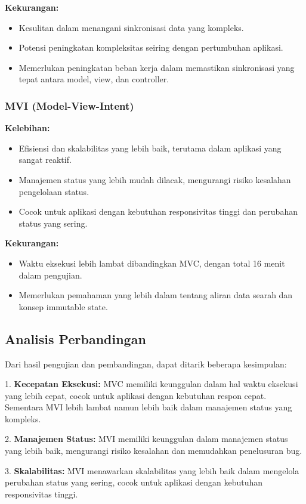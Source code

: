\documentclass[conference]{IEEEtran}
\begin{document}
\textbf{Kekurangan:}
\begin{itemize}
    \item Kesulitan dalam menangani sinkronisasi data yang kompleks.
    \item Potensi peningkatan kompleksitas seiring dengan pertumbuhan aplikasi.
    \item Memerlukan peningkatan beban kerja dalam memastikan sinkronisasi yang tepat antara model, view, dan controller.
\end{itemize}

\subsubsection{MVI (Model-View-Intent)}
\textbf{Kelebihan:}
\begin{itemize}
    \item Efisiensi dan skalabilitas yang lebih baik, terutama dalam aplikasi yang sangat reaktif.
    \item Manajemen status yang lebih mudah dilacak, mengurangi risiko kesalahan pengelolaan status.
    \item Cocok untuk aplikasi dengan kebutuhan responsivitas tinggi dan perubahan status yang sering.
\end{itemize}

\textbf{Kekurangan:}
\begin{itemize}
    \item Waktu eksekusi lebih lambat dibandingkan MVC, dengan total 16 menit dalam pengujian.
    \item Memerlukan pemahaman yang lebih dalam tentang aliran data searah dan konsep immutable state.
\end{itemize}

\subsection{Analisis Perbandingan}
Dari hasil pengujian dan pembandingan, dapat ditarik beberapa kesimpulan:

1. \textbf{Kecepatan Eksekusi:} MVC memiliki keunggulan dalam hal waktu eksekusi yang lebih cepat, cocok untuk aplikasi dengan kebutuhan respon cepat. Sementara MVI lebih lambat namun lebih baik dalam manajemen status yang kompleks.

2. \textbf{Manajemen Status:} MVI memiliki keunggulan dalam manajemen status yang lebih baik, mengurangi risiko kesalahan dan memudahkan penelusuran bug.

3. \textbf{Skalabilitas:} MVI menawarkan skalabilitas yang lebih baik dalam mengelola perubahan status yang sering, cocok untuk aplikasi dengan kebutuhan responsivitas tinggi.
\end{document}
